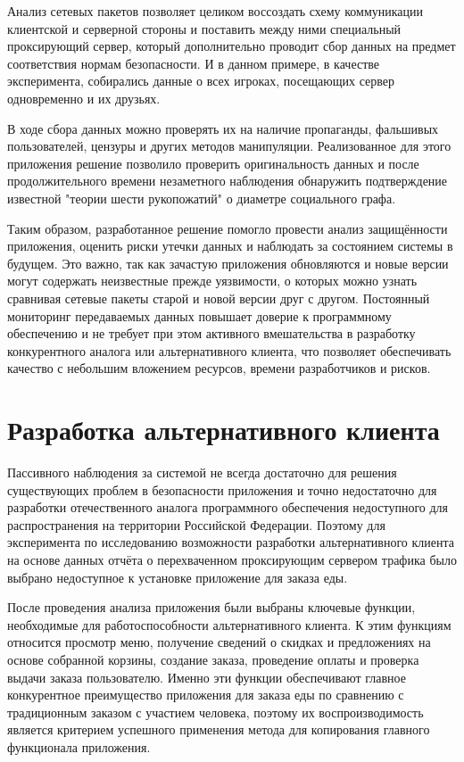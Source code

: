 Анализ сетевых пакетов позволяет целиком воссоздать схему коммуникации клиентской и серверной стороны и поставить между ними специальный проксирующий сервер, который дополнительно проводит сбор данных на предмет соответствия нормам безопасности. И в данном примере, в качестве эксперимента, собирались данные о всех игроках, посещающих сервер одновременно и их друзьях.

В ходе сбора данных можно проверять их на наличие пропаганды, фальшивых пользователей, цензуры и других методов манипуляции. Реализованное для этого приложения решение позволило проверить оригинальность данных и после продолжительного времени незаметного наблюдения обнаружить подтверждение известной "теории шести рукопожатий" о диаметре социального графа.

Таким образом, разработанное решение помогло провести анализ защищённости приложения, оценить риски утечки данных и наблюдать за состоянием системы в будущем. Это важно, так как зачастую приложения обновляются и новые версии могут содержать неизвестные прежде уязвимости, о которых можно узнать сравнивая сетевые пакеты старой и новой версии друг с другом. Постоянный мониторинг передаваемых данных повышает доверие к программному обеспечению и не требует при этом активного вмешательства в разработку конкурентного аналога или альтернативного клиента, что позволяет обеспечивать качество с небольшим вложением ресурсов, времени разработчиков и рисков.

\section{Разработка альтернативного клиента}

Пассивного наблюдения за системой не всегда достаточно для решения существующих проблем в безопасности приложения и точно недостаточно для разработки отечественного аналога программного обеспечения недоступного для распространения на территории Российской Федерации. Поэтому для эксперимента по исследованию возможности разработки альтернативного клиента на основе данных отчёта о перехваченном проксирующим сервером трафика было выбрано недоступное к установке приложение для заказа еды.

После проведения анализа приложения были выбраны ключевые функции, необходимые для работоспособности альтернативного клиента. К этим функциям относится просмотр меню, получение сведений о скидках и предложениях на основе собранной корзины, создание заказа, проведение оплаты и проверка выдачи заказа пользователю. Именно эти функции обеспечивают главное конкурентное преимущество приложения для заказа еды по сравнению с традиционным заказом с участием человека, поэтому их воспроизводимость является критерием успешного применения метода для копирования главного функционала приложения.

